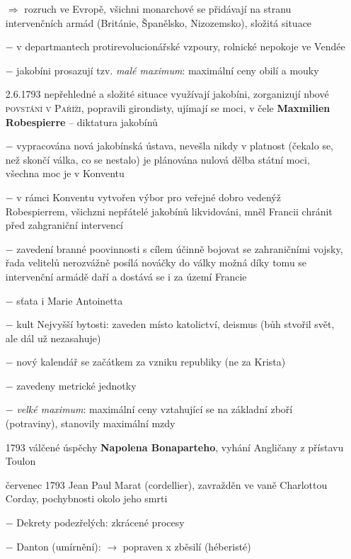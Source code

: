 \documentclass{article}
\begin{document}
\begin{itemize}
    \vspace{-0.5em}
    \setlength\itemsep{0.15em}


    \item[$\Rightarrow$] rozruch ve Evropě, všichni monarchové se přidávají na stranu intervenčních armád (Británie, Španělsko, Nizozemsko), složitá situace
    \item[$-$] v departmantech protirevolucionářské vzpoury, rolnické nepokoje ve Vendée
    \item[$-$] jakobíni prosazují tzv. \textit{malé maximum}: maximální ceny obilí a mouky
    \item[2.6.1793] nepřehledné a složité situace využívají jakobíni, zorganizují nbové \textsc{povstání v Paříži}, popravili girondisty, ujímají se moci, v čele \textbf{Maxmilien Robespierre} -- diktatura jakobínů
    \item[$-$] vypracována nová jakobínská ústava, nevešla nikdy v platnost (čekalo se, než skončí válka, co se nestalo) je plánována nulová dělba státní moci, všechna moc je v Konventu
    \item[$-$] v rámci Konventu vytvořen výbor pro veřejné dobro vedenýž Robespierrem, všichzni nepřátelé jakobínů likvidováni, mněl Francii chránit před zahgraniční intervencí
    \item[$-$] zavedení branné poovinnosti s cílem účinně bojovat se zahraničními vojsky, řada velitelů nerozvážně posílá nováčky do války možná díky tomu se intervenční armádě daří a dostává se i za území Francie
    \item[$-$] sťata i Marie Antoinetta
    \item[$-$] kult Nejvyšší bytosti: zaveden místo katolictví, deismus (bůh stvořil svět, ale dál už nezasahuje)
    \item[$-$] nový kalendář se začátkem za vzniku republiky (ne za Krista)
    \item[$-$] zavedeny metrické jednotky
    \item[$-$] \textit{velké maximum}: maximální ceny vztahující se na základní zboří (potraviny), stanovily maximální mzdy
    \item[1793] válčené úspěchy \textbf{Napolena Bonaparteho}, vyhání Angličany z přístavu Toulon
    \item[červenec 1793]  Jean Paul Marat (cordellier), zavražděn ve vaně Charlottou Corday, pochybnosti okolo jeho smrti
    \item[$-$] Dekrety podezřelých: zkrácené procesy
    \item[$-$] Danton (umírnění):  $\rightarrow$ popraven x zběsilí (héberisté)

\end{itemize}
\end{document}
